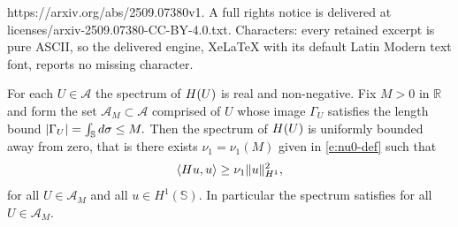 \documentclass[10pt,a4paper]{amsart}
\def\cA{{\mathcal A}}
\def\mbbR{\mathbb{R}}
\def\mbbS{\mathbb{S}}
\def\mrH{\textrm H}
\def\mrd{\textrm d}
\newcommand{\beq}{\begin{equation}}
\newcommand{\eeq}{\end{equation}}
\begin{document}
https://arxiv.org/abs/2509.07380v1. A full rights notice is delivered at licenses/arxiv-2509.07380-CC-BY-4.0.txt. Characters: every retained excerpt is pure ASCII, so the delivered engine, XeLaTeX with its default Latin Modern text font, reports no missing character.
\begin{lemma}
\label{l:H_coerc}
For each $U\in\cA$ the spectrum of $\mrH(U)$ is real and non-negative. Fix $M>0$ in $\mbbR$ and form  the set $\cA_M\subset\cA$ comprised of $U$  whose image $\Gamma_U$ satisfies the length bound $|\Gamma_U|=\int_\mbbS \mrd\sigma \leq M.$  Then the spectrum of $\mrH(U)$ is uniformly bounded away from zero, that is there exists $\nu_1=\nu_1(M)$ given in \eqref{e:nu0-def} such that
\beq\label{e:H-L2coer}
\langle \mrH u,u\rangle \geq \nu_1 \|u\|_{H^1}^2,
\eeq
for all $U\in\cA_M$ and all $u\in H^1(\mbbS).$
In particular the spectrum satisfies  for all $U\in\cA_M.$ 
\end{lemma}
\end{document}
